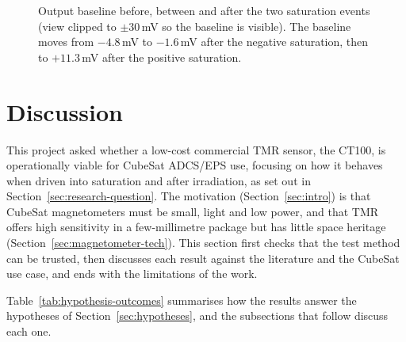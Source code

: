 \documentclass[12pt,a4paper]{article}
\begin{document}
 
\begin{figure}[H]
\centering
{}
\caption{Output baseline before, between and after the two saturation events (view clipped to $\pm30$\,mV so the baseline is visible). The baseline moves from $-4.8$\,mV to $-1.6$\,mV after the negative saturation, then to $+11.3$\,mV after the positive saturation.}
\label{fig:mh-baseline}
\end{figure}
 

 

\section{Discussion}
\label{sec:discussion}

This project asked whether a low-cost commercial TMR sensor, the CT100, is operationally viable for CubeSat ADCS/EPS use, focusing on how it behaves when driven into saturation and after irradiation, as set out in Section~\ref{sec:research-question}. The motivation (Section~\ref{sec:intro}) is that CubeSat magnetometers must be small, light and low power, and that TMR offers high sensitivity in a few-millimetre package but has little space heritage (Section~\ref{sec:magnetometer-tech}). This section first checks that the test method can be trusted, then discusses each result against the literature and the CubeSat use case, and ends with the limitations of the work.

Table~\ref{tab:hypothesis-outcomes} summarises how the results answer the hypotheses of Section~\ref{sec:hypotheses}, and the subsections that follow discuss each one.
\end{document}
